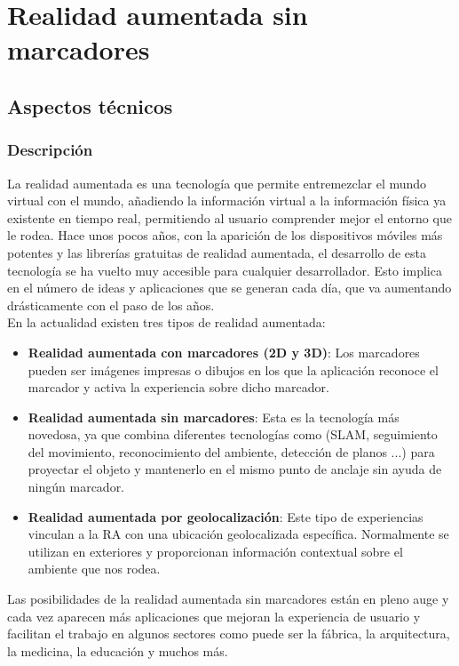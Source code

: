 \chapter{ Realidad aumentada sin marcadores }

\section{Aspectos técnicos}
\subsection{Descripción}
La realidad aumentada es una tecnología que permite entremezclar el mundo virtual con el mundo, añadiendo la información virtual a la información física ya existente en tiempo real, permitiendo al usuario comprender mejor el entorno que le rodea. Hace unos pocos años, con la aparición de los dispositivos móviles más potentes y las librerías gratuitas de realidad aumentada, el desarrollo de esta tecnología se ha vuelto muy accesible para cualquier desarrollador. Esto implica en el número de ideas y aplicaciones que se generan cada día, que va aumentando drásticamente con el paso de los años.\\

En la actualidad existen tres tipos de realidad aumentada:
\begin{itemize}
\item \textbf{Realidad aumentada con marcadores (2D y 3D)}: Los marcadores pueden ser imágenes impresas o dibujos en los que la aplicación reconoce el marcador y activa la experiencia sobre dicho marcador.
\item \textbf{Realidad aumentada sin marcadores}: Esta es la tecnología más novedosa, ya que combina diferentes tecnologías como (SLAM, seguimiento del movimiento, reconocimiento del ambiente, detección de planos ...) para proyectar el objeto y mantenerlo en el mismo punto de anclaje sin ayuda de ningún marcador.
\item \textbf{Realidad aumentada por geolocalización}: Este tipo de experiencias vinculan a la RA con una ubicación geolocalizada específica. Normalmente se utilizan en exteriores y proporcionan información contextual sobre el ambiente que nos rodea.
\end{itemize}
Las posibilidades de la realidad aumentada sin marcadores están en pleno auge y cada vez aparecen más aplicaciones que mejoran la experiencia de usuario y facilitan el trabajo en algunos sectores como puede ser la fábrica, la arquitectura, la medicina, la educación y muchos más.

